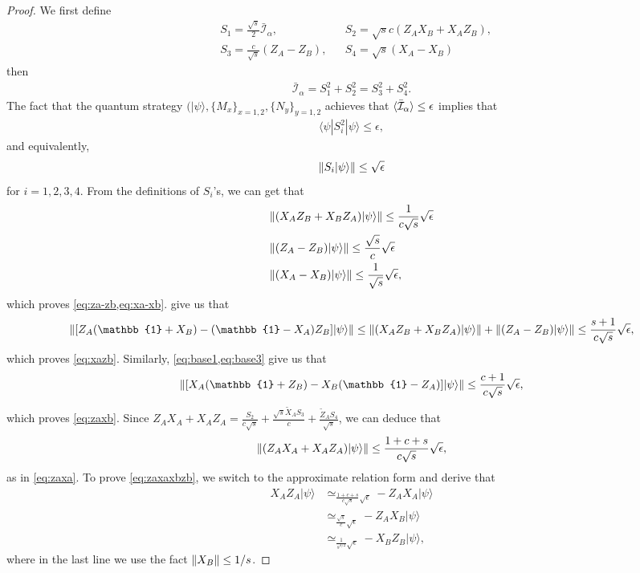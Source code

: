 \documentclass[11pt,letterpaper]{article}
\newcommand{\ket}[1]{|#1\rangle}
\newcommand{\bra}[1]{\langle#1|}
\DeclarePairedDelimiter{\norm}{\lVert}{\rVert}
\DeclarePairedDelimiter{\ip}{\langle}{\rangle}
\newcommand{\1}{\mathbb{1}}
\newcommand{\I}{\mathcal{I}}
\newcommand{\ep}{\epsilon}
\newcommand{\se}{\sqrt{\epsilon}}
\newcommand{\appd}[1]{\simeq_{#1}}
\theoremstyle{definition}
\begin{document}
\begin{proof}
We first define
\begin{align*}
	&S_1 = \frac{\sqrt{s}}{2} \bar{\I}_\alpha, &&
	S_2 = \sqrt{s}c(Z_AX_B+ X_AZ_B),\\
	&S_3 = \frac{c}{\sqrt{s}}(Z_A-Z_B), &&
	S_4 = \sqrt{s}(X_A-X_B)
\end{align*}
then 
\begin{align}
\bar{\I}_\alpha = S_1^2 + S_2^2 = S_3^2 + S_4^2.
\end{align}
The fact that the quantum strategy $(\ket{\psi}, \{M_x\}_{x=1,2}, \{N_{y }\}_{y=1,2}$ achieves that 
$\ip{\bar{\I}_\alpha} \leq \epsilon$ implies that
\begin{align*}
    \bra{\psi} S_i^2 \ket{\psi} \leq \ep,
\end{align*}
and equivalently,
\begin{align*}
   \norm{S_i \ket{\psi}} \leq \se 
\end{align*}
for $i = 1,2,3,4$.
From the definitions of $S_i$'s, we can get that 
\begin{align}
	\label{eq:base1} &\norm{(X_AZ_B+X_BZ_A)\ket{\psi}} \leq \frac{1}{c\sqrt{s}} \se\\
	\label{eq:base2} &\norm{(Z_A-Z_B)\ket{\psi}} \leq \frac{\sqrt{s}}{c} \se\\
	\label{eq:base3} &\norm{(X_A-X_B)\ket{\psi}} \leq \frac{1}{\sqrt{s}} \se,
\end{align}
which proves \cref{eq:za-zb,eq:xa-xb}.
 give us that 
\begin{align*}
	\norm{ [Z_A(\1+X_B) - (\1-X_A)Z_B] \ket{\psi} } 
	\leq \norm{(X_AZ_B+X_BZ_A)\ket{\psi}} + \norm{(Z_A-Z_B)\ket{\psi}}
	\leq \frac{s+1}{c\sqrt{s}} \se,
\end{align*}
which proves \cref{eq:xazb}.
Similarly, \cref{eq:base1,eq:base3} give us that 
\begin{align*}
	\norm{[X_A(\1+Z_B) - X_B(\1-Z_A)] \ket{\psi}} \leq \frac{c+1}{c\sqrt{s}} \se,
\end{align*}
which proves \cref{eq:zaxb}.
Since $Z_AX_A +X_A Z_A = \frac{S_2}{c\sqrt{s}} + \frac{\sqrt{s}\tilde{X}_AS_3}{c} + \frac{\tilde{Z}_AS_4}{\sqrt{s}}$, we can deduce that
\begin{align*}
	\norm{ (Z_A X_A+X_AZ_A)\ket{\psi}} \leq \frac{1+c+s}{c\sqrt{s}} \se,
\end{align*}
as in \cref{eq:zaxa}.
To prove \cref{eq:zaxaxbzb}, we switch to the approximate relation form and derive that 
\begin{align}
	X_AZ_A \ket{\psi} &\appd{\frac{1+c+s}{c\sqrt{s}} \se}  -Z_AX_A \ket{\psi} \\
	&\appd{\frac{\sqrt{s}}{c} \se} -Z_AX_B \ket{\psi} \\
	&\appd{\frac{1}{s^{3/2} }\se} -X_BZ_B\ket{\psi},
\end{align}
where in the last line we use the fact $\norm{X_B} \leq 1/s$.


\end{proof}
\end{document}
